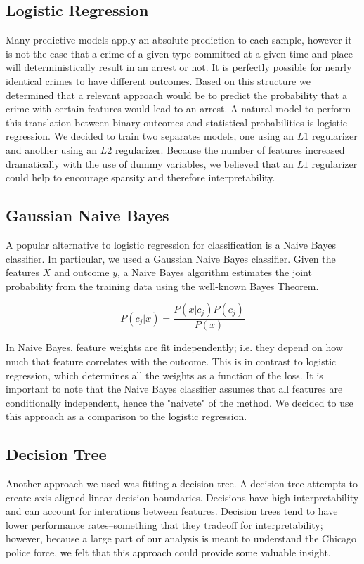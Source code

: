 \documentclass[10pt]{SelfArx} %
\begin{document}
    \subsection{Logistic Regression}
    Many predictive models apply an absolute prediction to each sample, however it is not the case that a crime of a given type committed at a given time and place will deterministically result in an arrest or not. It is perfectly possible for nearly identical crimes to have different outcomes. Based on this structure we determined that a relevant approach would be to predict the probability that a crime with certain features would lead to an arrest. A natural model to perform this translation between binary outcomes and statistical probabilities is logistic regression. We decided to train two separates models, one using an $L1$ regularizer and another using an $L2$ regularizer. Because the number of features increased dramatically with the use of dummy variables, we believed that an $L1$ regularizer could help to encourage sparsity and therefore interpretability.

    \subsection{Gaussian Naive Bayes}
    A popular alternative to logistic regression for classification is a Naive Bayes classifier. In particular, we used a Gaussian Naive Bayes classifier. Given the features $X$ and outcome $y$, a Naive Bayes algorithm estimates the joint probability from the training data using the well-known Bayes Theorem.

        \begin{equation}
         P(c_j | x)= \dfrac{P(x|c_j)P(c_j)}{P(x)}
        \end{equation}

    In Naive Bayes, feature weights are fit independently; i.e. they depend on how much that feature correlates with the outcome. This is in contrast to logistic regression, which determines all the weights as a function of the loss. It is important to note that the Naive Bayes classifier assumes that all features are conditionally independent, hence the "naivete" of the method. We decided to use this approach as a comparison to the logistic regression.

    \subsection{Decision Tree}
    Another approach we used was fitting a decision tree. A decision tree attempts to create axis-aligned linear decision boundaries. Decisions have high interpretability and can account for interations between features. Decision trees tend to have lower performance rates--something that they tradeoff for interpretability; however, because a large part of our analysis is meant to understand the Chicago police force, we felt that this approach could provide some valuable insight.
\end{document}
